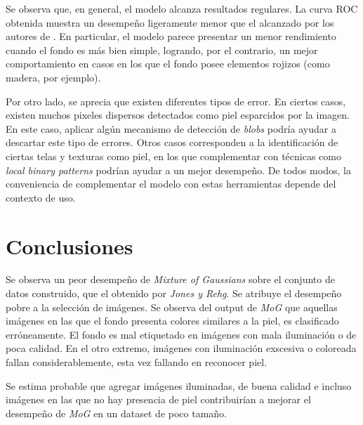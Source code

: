 \documentclass[12pt]{article}
\begin{document}
Se observa que, en general, el modelo alcanza resultados regulares. La curva ROC
obtenida muestra un desempeño ligeramente menor que el alcanzado por los autores
de \cite{skin}. En particular, el modelo parece presentar un menor rendimiento
cuando el fondo es más bien simple, logrando, por el contrario, un mejor
comportamiento en casos en los que el fondo posee elementos rojizos (como
madera, por ejemplo). 

Por otro lado, se aprecia que existen diferentes tipos de error. En ciertos
casos, existen muchos pixeles dispersos detectados como piel esparcidos por la
imagen. En este caso, aplicar algún mecanismo de detección de \emph{blobs}
podría ayudar a descartar este tipo de errores. Otros casos corresponden a la
identificación de ciertas telas y texturas como piel, en los que complementar
con técnicas como \emph{local binary patterns} podrían ayudar a un mejor
desempeño. De todos modos, la conveniencia de complementar el modelo con estas
herramientas depende del contexto de uso.

\section{Conclusiones}




Se observa un peor desempeño de \emph{Mixture of Gaussians} sobre el conjunto de datos construido, que el obtenido por \emph{Jones y Rehg}.
Se atribuye el desempeño pobre a la selección de imágenes. Se observa del output de \emph{MoG} que aquellas imágenes en las que el fondo
presenta colores similares a la piel, es clasificado erróneamente. El fondo es mal etiquetado en imágenes con mala iluminación o de poca calidad.
En el otro extremo, imágenes con iluminación exscesiva o coloreada fallan considerablemente, esta vez fallando en reconocer piel. 

Se estima probable que agregar imágenes iluminadas, de buena calidad e incluso imágenes en las que no hay presencia de piel contribuirían
a mejorar el desempeño de \emph{MoG} en un dataset de poco tamaño.






\end{document}
